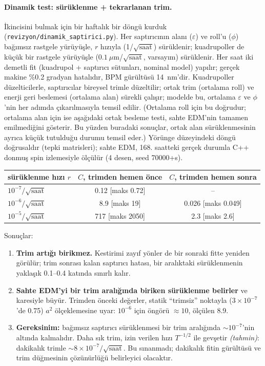 \documentclass[12pt,a4paper]{extarticle}
\newcommand{\tahmin}{\textit{(tahmin)}}
\begin{document}
\paragraph{Dinamik test: sürüklenme + tekrarlanan trim.} İkincisini bulmak için bir haftalık bir döngü kurduk
(\texttt{revizyon/dinamik\_saptirici.py}). Her saptırıcının alanı ($\varepsilon$) ve roll'u ($\phi$) bağımsız
rastgele yürüyüşle, $r$ hızıyla (1/$\sqrt{\text{saat}}$) sürüklenir; kuadrupoller de küçük bir rastgele
yürüyüşle ($0.1~\mu$m/$\sqrt{\text{saat}}$, varsayım) sürüklenir. Her saat iki demetli fit (kuadrupol +
saptırıcı sütunları, nominal model) yapılır; gerçek makine \%0.2 gradyan hatalıdır, BPM gürültüsü 14~nm'dir.
Kuadrupoller düzelticilerle, saptırıcılar bireysel trimle düzeltilir; ortak trim (ortalama roll) ve enerji
geri beslemesi (ortalama alan) sürekli çalışır; modelde bu, ortalama $\varepsilon$ ve $\phi$'nin her adımda
çıkarılmasıyla temsil edilir. (Ortalama roll için bu doğrudur; ortalama alan için ise aşağıdaki ortak besleme
testi, sahte EDM'nin tamamen emilmediğini gösterir. Bu yüzden buradaki sonuçlar, ortak alan sürüklenmesinin
ayrıca küçük tutulduğu durumu temsil eder.) Yörünge düzeyindeki döngü doğrusaldır (tepki matrisleri);
sahte EDM, 168. saatteki gerçek durumla C++ donmuş spin izlemesiyle ölçülür (4 desen, seed 70000+s).
\begin{center}\footnotesize
\begin{tabular}{lcc}\toprule
sürüklenme hızı $r$ & $C$, trimden hemen önce & $C$, trimden hemen sonra\\\midrule
$10^{-7}/\sqrt{\text{saat}}$ & 0.12 [maks 0.72] & --\\
$10^{-6}/\sqrt{\text{saat}}$ & 8.9 [maks 19] & 0.026 [maks 0.049]\\
$10^{-5}/\sqrt{\text{saat}}$ & 717 [maks 2050] & 2.3 [maks 2.6]\\\bottomrule
\end{tabular}\end{center}
Sonuçlar:
\begin{enumerate}
\item \textbf{Trim artığı birikmez.} Kestirimi zayıf yönler de bir sonraki fitte yeniden görülür; trim
sonrası kalan saptırıcı hatası, bir aralıktaki sürüklenmenin yaklaşık 0.1--0.4 katında sınırlı kalır.
\item \textbf{Sahte EDM'yi bir trim aralığında biriken sürüklenme belirler} ve karesiyle büyür. Trimden önceki
değerler, statik ``trimsiz'' noktayla ($3\times10^{-7}$'de 0.75) $a^2$ ölçeklemesine uyar: $10^{-6}$ için
öngörü $\approx10$, ölçülen 8.9.
\item \textbf{Gereksinim:} bağımsız saptırıcı sürüklenmesi bir trim aralığında $\sim10^{-7}$'nin altında
kalmalıdır. Daha sık trim, izin verilen hızı $T^{-1/2}$ ile gevşetir \tahmin: dakikalık trimle
$\sim8\times10^{-7}/\sqrt{\text{saat}}$. Bu sınanmadı; dakikalık fitin gürültüsü ve trim düğmesinin
çözünürlüğü belirleyici olacaktır.
\end{enumerate}
\end{document}
